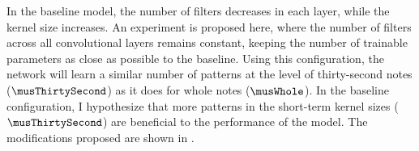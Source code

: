 
In the baseline model, the number of filters decreases in
each layer, while the kernel size increases. An experiment
is proposed here, where the number of filters across all
convolutional layers remains constant, keeping the number of
trainable parameters as close as possible to the baseline.
Using this configuration, the network will learn a similar
number of patterns at the level of thirty-second notes
($\musThirtySecond$) as it does for whole notes
($\musWhole$). In the baseline configuration, I hypothesize
that more patterns in the short-term kernel sizes
($\musThirtySecond$) are beneficial to the performance of
the model. The modifications proposed are shown in
.


